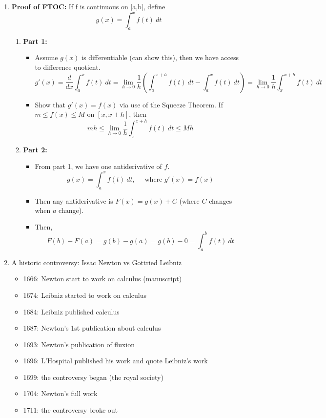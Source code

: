 \documentclass{article}
\begin{document}
\begin{enumerate}
\item {\bf Proof of FTOC:} If f is continuous on [a,b], define
$$
g(x) = \int_a^x f(t)~dt
$$
\begin{enumerate}
\item {\bf Part 1:}
\begin{itemize}
\item Assume $g(x)$ is differentiable (can show this), then we have access to difference quotient.
\[ 
g'(x) = \frac{d}{dx} \int_a^x f(t)~dt = \lim_{h\rightarrow 0} \frac{1}{h}  \left(\int_a^{x+h} f(t)~dt - \int_a^x f(t)~dt \right) = \lim_{h\rightarrow 0} \frac{1}{h} \int_x^{x+h} f(t)~dt
\]
\item Show that $g'(x) = f(x)$ via use of the Squeeze Theorem. If $m\leq f(x) \leq M$ on $[x,x+h]$, then
\[
mh \leq \lim_{h\rightarrow 0} \frac{1}{h} \int_x^{x+h} f(t)~dt \leq Mh
\]
\end{itemize}
\item {\bf Part 2:}
\begin{itemize}
\item From part 1, we have one antiderivative of $f$.
\[
g(x) = \int_a^x f(t)~dt, \quad \text{ where } g'(x) = f(x)
\]
\item Then any antiderivative is $F(x) = g(x)+C$ (where $C$ changes when $a$ change).
\item Then, 
$$
F(b)-F(a) = g(b) - g(a) = g(b) - 0 = \int_a^b f(t)~dt
$$
\end{itemize}
\end{enumerate}

\item A historic controversy: Issac Newton vs Gottried Leibniz
\begin{itemize}
\item 1666: Newton start to work on calculus (manuscript)
\item 1674: Leibniz started to work on calculus
\item 1684: Leibniz published calculus
\item 1687: Newton's 1st publication about calculus
\item 1693: Newton's publication of fluxion
\item 1696: L'Hospital published his work and quote Leibniz's work
\item 1699: the controversy began (the royal society)
\item 1704: Newton's full work
\item 1711: the controversy broke out
\end{itemize}


\end{enumerate}
\end{document}
